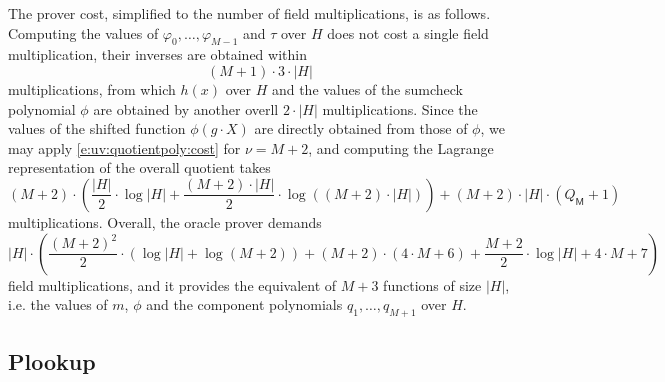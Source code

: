 \documentclass[11pt]{article}
\theoremstyle{definition}
\theoremstyle{remark}
\begin{document}
The prover cost, simplified to the number of field multiplications, is as follows.
Computing the values of $\varphi_0, \ldots, \varphi_{M-1}$ and $\tau$ over $H$ does not cost a single field multiplication, their inverses are obtained within
\[
(M+1)\cdot 3\cdot |H| 
\]
multiplications, from which $h(x)$ over $H$ and the values of the sumcheck polynomial $\phi$ are obtained by another overll $2\cdot |H|$ multiplications.
Since the values of the shifted function $\phi(g\cdot X)$ are directly obtained from those of $\phi$, we may apply 
\eqref{e:uv:quotientpoly:cost} for $\nu = M + 2$, and computing the Lagrange representation of the overall quotient takes
\[
(M + 2) \cdot \left(\frac{|H|}{2}\cdot \log|H| + \frac{(M+2)\cdot |H|}{2} \cdot\log((M+2)\cdot|H|) \right) + (M+2)\cdot |H|\cdot (Q_\mathsf M + 1)
\]
multiplications.
Overall, the oracle prover demands
\begin{equation}
 |H| \cdot\left(\frac{(M + 2)^2}{2}\cdot (\log|H| + \log (M+2)) +  (M + 2)\cdot(4\cdot M+6) + \frac{M+2}{2} \cdot \log |H| + 4\cdot M + 7   \right)
\end{equation}
field multiplications, and it provides the equivalent of $M + 3$ functions of size $|H|$, i.e. the values of $m$, $\phi$  and the component polynomials $q_1, \ldots, q_{M+1}$ over $H$.
%
%
% 

\subsection{Plookup}
\label{s:uv:plookup}
\end{document}
